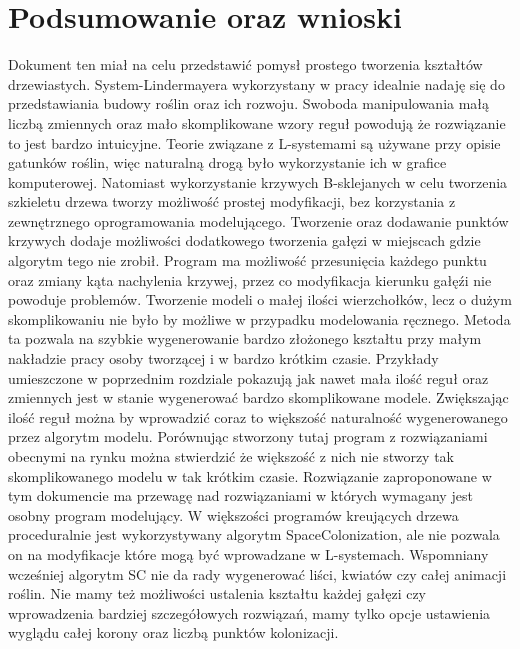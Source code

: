 \documentclass[12pt]{report}
\begin{document}
\begin{sloppypar}
\section{Podsumowanie oraz wnioski}
Dokument ten miał na celu przedstawić pomysł prostego tworzenia kształtów drzewiastych. System-Lindermayera wykorzystany w pracy idealnie nadaję się do przedstawiania budowy roślin oraz ich rozwoju. Swoboda manipulowania małą liczbą zmiennych oraz mało skomplikowane wzory reguł powodują że rozwiązanie to jest bardzo intuicyjne. Teorie związane z L-systemami są używane przy opisie gatunków roślin, więc naturalną drogą było wykorzystanie ich w grafice komputerowej. Natomiast wykorzystanie krzywych B-sklejanych w celu tworzenia szkieletu drzewa tworzy możliwość prostej modyfikacji, bez korzystania z zewnętrznego oprogramowania modelującego. Tworzenie oraz dodawanie punktów krzywych dodaje możliwości dodatkowego tworzenia gałęzi w miejscach gdzie algorytm tego nie zrobił. Program ma możliwość przesunięcia każdego punktu oraz zmiany kąta nachylenia krzywej, przez co modyfikacja kierunku gałęźi nie powoduje problemów. Tworzenie modeli o małej ilości wierzchołków, lecz o dużym skomplikowaniu nie było by możliwe w przypadku modelowania ręcznego. Metoda ta pozwala na szybkie wygenerowanie bardzo złożonego kształtu przy małym nakładzie pracy osoby tworzącej i w bardzo krótkim czasie. Przykłady umieszczone w poprzednim rozdziale pokazują jak nawet mała ilość reguł oraz zmiennych jest w stanie wygenerować bardzo skomplikowane modele. Zwiększając ilość reguł można by wprowadzić coraz to większość naturalność wygenerowanego przez algorytm modelu.
Porównując stworzony tutaj program z rozwiązaniami obecnymi na rynku można stwierdzić że większość z nich nie stworzy tak skomplikowanego modelu w tak krótkim czasie. Rozwiązanie zaproponowane w tym dokumencie ma przewagę nad rozwiązaniami w których wymagany jest osobny program modelujący. W większości programów kreujących drzewa proceduralnie jest wykorzystywany algorytm SpaceColonization, ale nie pozwala on na modyfikacje które mogą być wprowadzane w L-systemach. Wspomniany wcześniej algorytm SC nie da rady wygenerować liści, kwiatów czy całej animacji roślin. Nie mamy też możliwości ustalenia kształtu każdej gałęzi czy wprowadzenia bardziej szczegółowych rozwiązań, mamy tylko opcje ustawienia wyglądu całej korony oraz liczbą punktów kolonizacji. 


\end{sloppypar}
\end{document}
